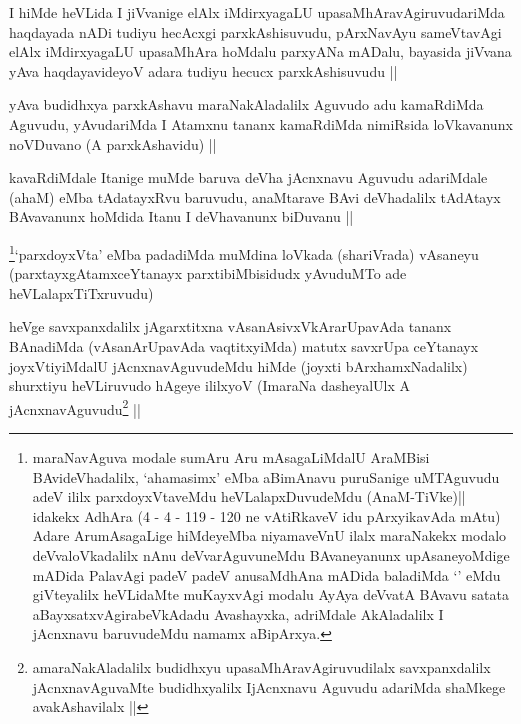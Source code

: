 
\begin{artha}
I hiMde heVLida I jiVvanige elAlx iMdirxyagaLU
upasaMhAravAgiruvudariMda haqdayada nADi tudiyu hecAcxgi
parxkAshisuvudu, pArxNavAyu sameVtavAgi elAlx iMdirxyagaLU upasaMhAra
hoMdalu parxyANa mADalu, bayasida jiVvana yAva haqdayavideyoV adara
tudiyu hecucx parxkAshisuvudu ||
\end{artha}


\begin{artha}
yAva budidhxya parxkAshavu maraNakAladalilx Aguvudo adu kamaRdiMda
Aguvudu, yAvudariMda I Atamxnu tananx kamaRdiMda nimiRsida loVkavanunx
noVDuvano (A parxkAshavidu) ||
\end{artha}


\begin{artha}
kavaRdiMdale Itanige muMde baruva deVha jAcnxnavu Aguvudu adariMdale
(ahaM) eMba tAdatayxRvu baruvudu, anaMtarave BAvi deVhadalilx tAdAtayx
BAvavanunx hoMdida Itanu I deVhavanunx biDuvanu ||
\end{artha}



\begin{artha}
\footnote{maraNavAguva modale sumAru Aru mAsagaLiMdalU AraMBisi
  BAvideVhadalilx, `ahamasimx' eMba aBimAnavu puruSanige uMTAguvudu
  adeV ililx parxdoyxVtaveMdu heVLalapxDuvudeMdu (AnaM-TiVke)|| idakekx
AdhAra (4 - 4 - 119 - 120 ne vAtiRkaveV idu pArxyikavAda mAtu) Adare
ArumAsagaLige hiMdeyeMba niyamaveVnU ilalx maraNakekx modalo
deVvaloVkadalilx nAnu deVvarAguvuneMdu BAvaneyanunx upAsaneyoMdige
mADida PalavAgi padeV padeV anusaMdhAna mADida baladiMda
`\stext' eMdu giVteyalilx heVLidaMte muKayxvAgi modalu AyAya deVvatA
BAvavu satata aBayxsatxvAgirabeVkAdadu Avashayxka, adriMdale
AkAladalilx I jAcnxnavu baruvudeMdu namamx aBipArxya.}`parxdoyxVta' eMba padadiMda muMdina loVkada (shariVrada) vAsaneyu
  (parxtayxgAtamxceYtanayx parxtibiMbisidudx yAvuduMTo ade heVLalapxTiTxruvudu)
\end{artha}


\begin{artha}
heVge savxpanxdalilx jAgarxtitxna vAsanAsivxVkArarUpavAda tananx
BAnadiMda (vAsanArUpavAda vaqtitxyiMda) matutx savxrUpa ceYtanayx
joyxVtiyiMdalU jAcnxnavAguvudeMdu hiMde (joyxti bArxhamxNadalilx)
shurxtiyu heVLiruvudo hAgeye ililxyoV (ImaraNa dasheyalUlx A
jAcnxnavAguvudu\footnote{amaraNakAladalilx budidhxyu
  upasaMhAravAgiruvudilalx savxpanxdalilx jAcnxnavAguvaMte
  budidhxyalilx IjAcnxnavu Aguvudu adariMda shaMkege avakAshavilalx ||} ||
\end{artha}

